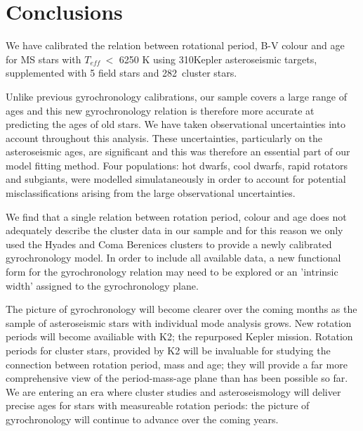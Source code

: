 \documentclass[10pt,preprint]{aastex}
\newcommand{\teff}{$T_{eff}~$}
\newcommand{\nastero}{310}
\newcommand{\ncluster}{282~}
\begin{document}
\section{Conclusions}
\label{sec:conclusions}

We have calibrated the relation between rotational period, B-V colour and age for MS stars with \teff $<$ 6250 K using \nastero Kepler asteroseismic targets, supplemented with 5 field stars and \ncluster cluster stars.

Unlike previous gyrochronology calibrations, our sample covers a large range of ages and this new gyrochronology relation is therefore more accurate at predicting the ages of old stars.
We have taken observational uncertainties into account throughout this analysis.
These uncertainties, particularly on the asteroseismic ages, are significant and this was therefore an essential part of our model fitting method.
Four populations: hot dwarfs, cool dwarfs, rapid rotators and subgiants, were modelled simulataneously in order to account for potential misclassifications arising from the large observational uncertainties.

We find that a single relation between rotation period, colour and age does not adequately describe the cluster data in our sample and for this reason we only used the Hyades and Coma Berenices clusters to provide a newly calibrated gyrochronology model.
In order to include all available data, a new functional form for the gyrochronology relation may need to be explored or an 'intrinsic width' assigned to the gyrochronology plane.


The picture of gyrochronology  will become clearer over the coming months as the sample of asteroseismic stars with individual mode analysis grows.
New rotation periods will become availiable with K2; the repurposed Kepler mission.
Rotation periods for cluster stars, provided by K2 will be invaluable for studying the connection between rotation period, mass and age; they will provide a far more comprehensive view of the period-mass-age plane than has been possible so far.
We are entering an era where cluster studies and asteroseismology will deliver precise ages for stars with measureable rotation periods: the picture of gyrochronology will continue to advance over the coming years.
\end{document}
